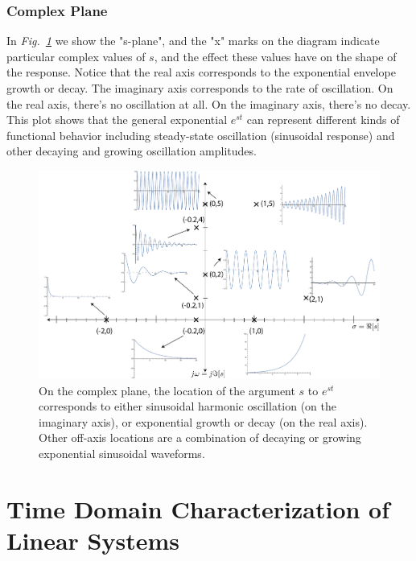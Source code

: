 \subsubsection{Complex Plane}
In \emph{Fig.~\ref{fig:splane}} we show the "s-plane", and the "x" marks on the diagram indicate particular complex values of $s$, and the effect these values have on the shape of the response.  Notice that the real axis corresponds to the exponential envelope growth or decay.  The imaginary axis corresponds to the rate of oscillation.  On the real axis, there's no oscillation at all. On the imaginary axis, there's no decay.  This plot shows that the general exponential $e^{st}$ can represent different kinds of functional behavior including steady-state oscillation (sinusoidal response) and other decaying and growing oscillation amplitudes.
\begin{figure}[tb]
\centering
\includegraphics[width=.85\columnwidth]{exp_graph.pdf}
\caption{On the complex plane, the location of the argument $s$ to $e^{st}$ corresponds to either sinusoidal harmonic oscillation (on the imaginary axis), or exponential growth or decay (on the real axis).  Other off-axis locations are a combination of decaying or growing exponential sinusoidal waveforms.}
\label{fig:splane}
\end{figure}
\section{Time Domain Characterization of Linear Systems}
